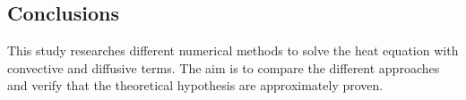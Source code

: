 \clearpage

\subsection{Conclusions}

This study researches different numerical methods to solve the heat equation with convective and diffusive terms. The aim is to compare the different approaches and verify that the theoretical hypothesis are approximately proven. 

